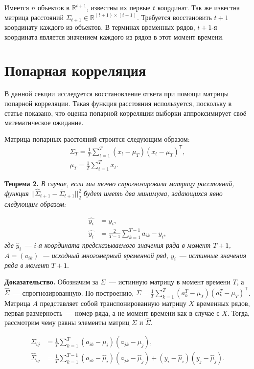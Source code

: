 \documentclass{article}
\begin{document}
Имеется $n$ объектов в $\mathbb{R}^{t+1}$, известны их первые $t$ координат. Так же известна матрица расстояний $\Sigma_{t+1} \in \mathbb{R}^{(t+1) \times (t+1)}$. Требуется восстановить $t+1$ координату каждого из объектов. В терминах временных рядов, $t+1$-я координата является значением каждого из рядов в этот момент времени.

\section{Попарная корреляция}

В данной секции исследуется восстановление ответа при помощи матрицы попарной корреляции. Такая функция расстояния используется, поскольку в статье \cite{puchkin2023sharper} показано, что оценка попарной корреляции выборки аппроксимирует своё математическое ожидание.

Матрица попарных расстояний строится следующим образом:
\begin{gather*}
	{\Sigma}_T = \frac{1}{T} \sum_{t=1}^{T} (x_t - \mu_T)(x_t - \mu_T)^\mathsf{T},\\
	\mu_T = \frac{1}{T} \sum_{t=1}^{T} x_t.
\end{gather*}

\textbf{Теорема 2.} \textit{В случае, если мы точно спрогнозировали матрицу расстояний, функция} $||\hat{\Sigma}_{t+1} - \bar{\Sigma}_{t+1}||_2^2$ \textit{будет иметь два минимума, задающихся явно следующим образом:}

\begin{align*}
	\hat{y_i} &= y_i,\\
	\hat{y_i} &= \frac{2}{T-1} \sum_{k=1}^{T-1} a_{ik} - y_i,
\end{align*}
\textit{где} $\hat{y}_i$~--- $i$\textit{-я координата предсказываемого значения ряда в момент $T+1$, $A=(a_{ik})$~--- исходный многомерный временной ряд,} $y_i$~--- \textit{истинные значения ряда в момент} $T+1$.

\textbf{Доказательство.} Обозначим за $\Sigma$~--- истинную матрицу в момент времени $T$, а $\hat{\Sigma}$~--- спрогнозированную. По построению, ${\Sigma} = \frac{1}{T} \sum_{k=1}^{T} (a^T_k - \mu_T)(a^T_k - \mu_T)^\intercal\texttt{}$. Матрица $A$ представляет собой транспонированную матрицу $X$ временных рядов, первая размерность~--- номер ряда, а не момент времени как в случае с $X$. Тогда, рассмотрим чему равны элементы матриц $\Sigma$ и $\hat{\Sigma}$.

\begin{align*}
	\Sigma_{ij} &= \frac{1}{T}\sum_{k=1}^{T}(a_{ik} - \mu_i)(a_{jk}-\mu_j),\\
	\hat{\Sigma}_{ij} &= \frac{1}{T}\sum_{k=1}^{T-1}(a_{ik} - \hat{\mu}_i)(a_{jk}-\hat{\mu}_j) + (y_i - \hat{\mu}_i)(y_j - \hat{\mu}_j).
\end{align*}
\end{document}
